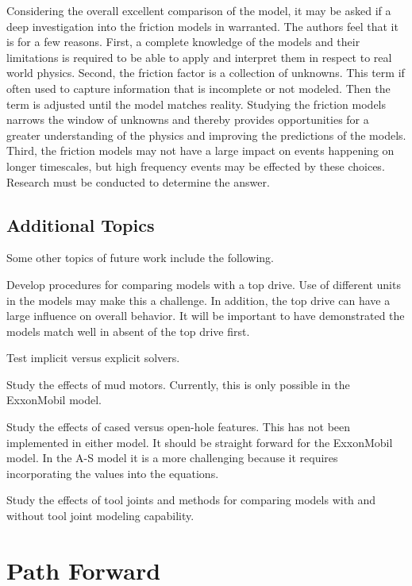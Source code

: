 Considering the overall excellent comparison of the model, it may be asked if a deep investigation into the friction models in warranted. The authors feel that it is for a few reasons.  First, a complete knowledge of the models and their limitations is required to be able to apply and interpret them in respect to real world physics.  Second, the friction factor is a collection of unknowns.  This term if often used to capture information that is incomplete or not modeled.  Then the term is adjusted until the model matches reality.  Studying the friction models narrows the window of unknowns and thereby provides opportunities for a greater understanding of the physics and improving the predictions of the models.  Third, the friction models may not have a large impact on events happening on longer timescales, but high frequency events may be effected by these choices.  Research must be conducted to determine the answer.

\subsection{Additional Topics}
Some other topics of future work include the following.
\begin{bulletedlist}
    \item Develop procedures for comparing models with a top drive.  Use of different units in the models may make this a challenge.  In addition, the top drive can have a large influence on overall behavior.  It will be important to have demonstrated the models match well in absent of the top drive first.
	\item Test implicit versus explicit solvers.
	\item Study the effects of mud motors.  Currently, this is only possible in the ExxonMobil model.
    \item Study the effects of cased versus open-hole features.  This has not been implemented in either model.  It should be straight forward for the ExxonMobil model.  In the A-S model it is a more challenging because it requires incorporating the values into the equations.
    \item Study the effects of tool joints and methods for comparing models with and without tool joint modeling capability.
\end{bulletedlist}

\section{Path Forward}
